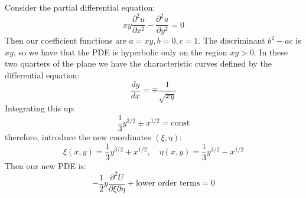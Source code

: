 \documentclass[../Main.tex]{subfiles}
\begin{document}
\begin{example}
    Consider the partial differential equation:
    \begin{equation*}
        xy \frac{\partial^{2}u}{\partial x^{2}} - \frac{\partial^{2}u}{\partial y^{2}} = 0
    \end{equation*}
    Then our coefficient functions are $a = xy, b = 0, c = 1$. The discriminant $b^2 - ac$ is $xy$, so we have that the PDE is hyperbolic only on the region $xy > 0$. In these two quarters of the plane we have the characteristic curves defined by the differential equation:
    \begin{equation*}
        \frac{dy}{dx} = \mp \frac{1}{\sqrt{xy}}
    \end{equation*}
    Integrating this up:
    \begin{equation*}
        \frac13 y^{3/2} \pm x^{1/2} = \text{const}
    \end{equation*}
    therefore, introduce the new coordinates $(\xi, \eta)$:
    \begin{equation*}
        \xi(x, y) = \frac13 y^{3/2} + x^{1/2},\quad\eta(x, y) = \frac13 y^{3/2} - x^{1/2}
    \end{equation*}
    Then our new PDE is:
    \begin{equation*}
        -\frac12 y \frac{\partial^{2}U}{\partial \xi\partial \eta} + \text{lower order terms} = 0
    \end{equation*}
\end{example}
\end{document}
